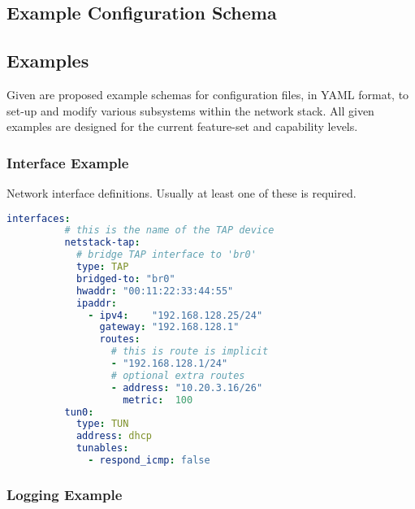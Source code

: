 
\begin{appendices}
\makeatletter
{}
\makeatother

\chapter{Example Configuration Schema}\label{apx:config-schema}

    \section{Examples}
    Given are proposed example schemas for configuration files, in YAML format, to set-up and modify various subsystems within the network stack. All given examples are designed for the current feature-set and capability levels.

        \subsection{Interface Example}\label{interface-example}

        Network interface definitions. Usually at least one of these is required.

        \begin{lstlisting}[language=yaml,gobble=8]
        interfaces:
          # this is the name of the TAP device
          netstack-tap:
            # bridge TAP interface to 'br0'
            type: TAP
            bridged-to: "br0"
            hwaddr: "00:11:22:33:44:55"
            ipaddr:
              - ipv4:    "192.168.128.25/24"
                gateway: "192.168.128.1"
                routes:
                  # this is route is implicit
                  - "192.168.128.1/24"
                  # optional extra routes
                  - address: "10.20.3.16/26"
                    metric:  100
          tun0:
            type: TUN
            address: dhcp
            tunables:
              - respond_icmp: false
        \end{lstlisting}

        \vfil

        \subsection{Logging Example}\label{apx:config-schema-log}


\end{appendices}
